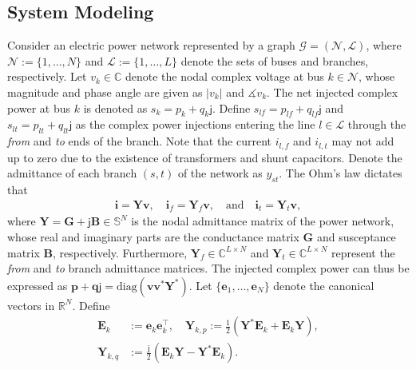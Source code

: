 \documentclass[journal,twoside]{IEEEtran}
\newcommand{\diag}{{\mathrm {diag}}}
\newcommand{\mi}{\mathsf{j}}
\newcommand{\be}{\mathbf{e}}
\newcommand{\bi}{\mathbf{i}}
\newcommand{\bp}{\mathbf{p}}
\newcommand{\bq}{\mathbf{q}}
\newcommand{\bv}{\mathbf{v}}
\newcommand{\bB}{\mathbf{B}}
\newcommand{\bE}{\mathbf{E}}
\newcommand{\bG}{\mathbf{G}}
\newcommand{\bY}{\mathbf{Y}}
\newcommand{\cG}{{\mathcal G}}
\newcommand{\cL}{{\mathcal L}}
\newcommand{\cN}{{\mathcal N}}
\begin{document}
\subsection{System Modeling}\label{sec:systmodel}
Consider an electric power network represented by a graph $\cG = (\cN,\cL)$,
where $\cN := \{1,\ldots,N\}$ and $\cL:= \{1,\ldots,L\}$ denote the sets of buses and branches, respectively.
Let $v_k \in \mathbb{C}$ denote the nodal complex voltage at bus $k\in\mathcal N$,
whose magnitude and phase angle are given as $|v_k|$ and $\measuredangle v_k$.
The net injected complex power at bus $k$ is denoted as $s_k=p_k+q_k\mi$.
Define $s_{lf}=p_{lf}+q_{lf}\mi$ and $s_{lt}=p_{lt}+q_{lt}\mi$
as the complex power injections entering the line $l\in \cL$ through the \emph{from} and \emph{to} ends of the branch. %
Note that the current $i_{l,f}$ and $i_{l,t}$  may not add up to zero due to the existence of transformers and shunt capacitors.
 Denote the admittance of each branch $(s,t)$ of the network as $y_{st}$.
The Ohm's law dictates that
\begin{align}
	\bi = \bY\bv,\quad \bi_{f} = \bY_{f}\bv,\quad \mathrm{and} \quad \bi_{t} = \bY_{t}\bv,
\end{align}
where $\bY = \bG + \mi\bB \in \mathbb{S}^{N}$ is the nodal admittance matrix of the power network, whose real and imaginary parts
are the conductance matrix $\bG$ and susceptance matrix $\bB$, respectively.
Furthermore, $\bY_{f}\in \mathbb{C}^{L\times N}$ and $ \bY_{t} \in \mathbb{C}^{L\times N}$
represent the \emph{from} and \emph{to} branch admittance matrices.
The injected complex power can thus be expressed as $\bp + \bq\mi = \diag(\bv\bv^{*}\bY^{*})$.
Let $\{\be_1,\ldots,\be_N\}$ denote the canonical vectors in $\mathbb{R}^N$. Define
\begin{equation}\label{nodalM}
	\begin{aligned}
		 \bE_{k}  &:= \be_k \be_k^{\top},\quad \bY_{k,p} := \frac{1}{2}(\bY^{*}\bE_{k}+\bE_{k}\bY),\\
		\bY_{k,q} &:= \frac{\mi}{2}(\bE_{k}\bY-\bY^{*}\bE_{k}).
	\end{aligned}
\end{equation}
\end{document}
